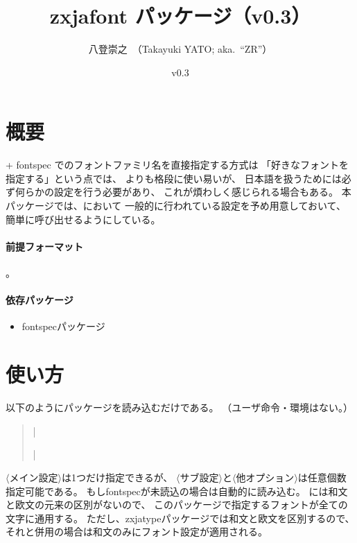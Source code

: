 \documentclass[xelatex,ja=standard,a4paper]{bxjsarticle}
\newcommand{\PkgVersion}{0.3}
\newcommand{\PkgDate}{0.3}
\newcommand{\Pkg}[1]{\textsf{#1}}
\newcommand{\Meta}[1]{$\langle$\mbox{}#1\mbox{}$\rangle$}
\begin{document}
\title{\Pkg{zxjafont} パッケージ（v\PkgVersion）}
\author{八登崇之\ （Takayuki YATO; aka.~``ZR''）}
\date{v\PkgVersion\quad[\PkgDate]}
\maketitle

\section{概要}

{\XeLaTeX} + fontspec でのフォントファミリ名を直接指定する方式は
「好きなフォントを指定する」という点では、
{\pLaTeX}\>よりも格段に使い易いが、
日本語を扱うためには必ず何らかの設定を行う必要があり、
これが煩わしく感じられる場合もある。
本パッケージでは、{\pLaTeX}\>において
一般的に行われている設定を予め用意しておいて、
簡単に呼び出せるようにしている。

\paragraph{前提フォーマット}
{\XeLaTeX}。

\paragraph{依存パッケージ}
\begin{itemize}
\item \Pkg{fontspec}パッケージ
\end{itemize}

\section{使い方}

以下のようにパッケージを読み込むだけである。
（ユーザ命令・環境はない。）
\begin{quote}\small
|\usepackage[|\Meta{メイン設定}|,|\Meta{サブ設定}|,|%
\Meta{他オプション}|]{zxjafont}|
\end{quote}

\Meta{メイン設定}は1つだけ指定できるが、
\Meta{サブ設定}と\Meta{他オプション}は任意個数指定可能である。
もし\Pkg{fontspec}が未読込の場合は自動的に読み込む。
{\XeLaTeX}\>には和文と欧文の元来の区別がないので、
このパッケージで指定するフォントが全ての文字に通用する。
ただし、\Pkg{zxjatype}パッケージでは和文と欧文を区別するので、
それと併用の場合は和文のみにフォント設定が適用される。
\end{document}
